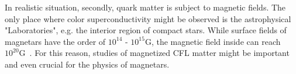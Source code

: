 \documentclass[prd, showpacs,nofootinbib,amsmath,amssymb,12pt]{revtex4}
\begin{document}
In realistic situation, secondly, quark matter is subject to magnetic fields.  
The only place where color superconductivity might be observed is the astrophysical "Laboratories", e.g. the interior region of compact stars. While surface fields of magnetars have the order of $10^{14}$ - $10^{15}\text{G}$, the magnetic field inside can reach $10^{20}\text{G}$~\cite{lai1991cold}.
For this reason, studies of magnetized CFL matter might be important and even crucial for the physics of magnetars.
\end{document}
